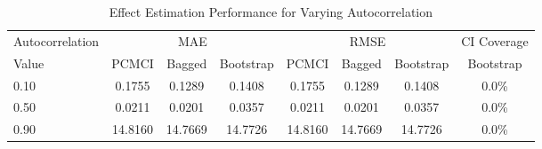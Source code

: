 \begin{table}[htbp]
\centering
\caption{Effect Estimation Performance for Varying Autocorrelation}
\label{tab:auto_performance}
\begin{tabular}{l|ccc|ccc|c}
\hline
Autocorrelation & \multicolumn{3}{c|}{MAE} & \multicolumn{3}{c|}{RMSE} & CI Coverage \\
 Value & PCMCI & Bagged & Bootstrap & PCMCI & Bagged & Bootstrap & Bootstrap \\
\hline
0.10 & 0.1755 & 0.1289 & 0.1408 & 0.1755 & 0.1289 & 0.1408 & 0.0\% \\
0.50 & 0.0211 & 0.0201 & 0.0357 & 0.0211 & 0.0201 & 0.0357 & 0.0\% \\
0.90 & 14.8160 & 14.7669 & 14.7726 & 14.8160 & 14.7669 & 14.7726 & 0.0\% \\
\hline
\end{tabular}
\end{table}
